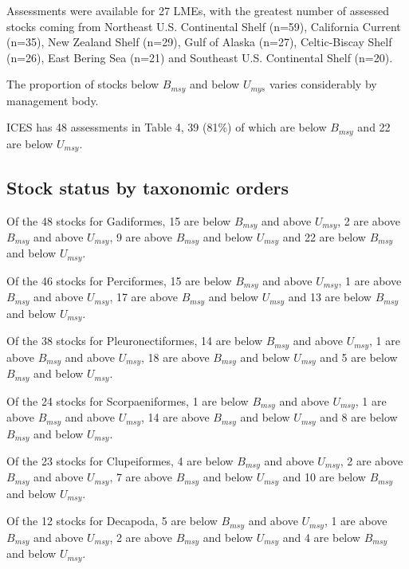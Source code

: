 

Assessments were available for 27 LMEs, with the greatest number of
assessed stocks coming from Northeast U.S. Continental Shelf (n=59),
California Current (n=35), New Zealand Shelf (n=29),
Gulf of Alaska (n=27), Celtic-Biscay Shelf (n=26), East Bering Sea (n=21)
and Southeast U.S. Continental Shelf (n=20).

The proportion of stocks below $B_{msy}$ and below $U_{mys}$ varies considerably by management body. 

ICES has 48 assessments in Table 4,
39
(81\%) of which are below
$B_{msy}$ and 22 are below
$U_{msy}$.

\subsection*{Stock status by taxonomic orders}

Of the 48 stocks for Gadiformes, 15 are below $B_{msy}$ and above $U_{msy}$, 2 are above $B_{msy}$ and above $U_{msy}$, 9 are above $B_{msy}$ and below $U_{msy}$ and 22 are below $B_{msy}$ and below $U_{msy}$.

Of the 46 stocks for Perciformes, 15 are below $B_{msy}$ and above $U_{msy}$, 1 are above $B_{msy}$ and above $U_{msy}$, 17 are above $B_{msy}$ and below $U_{msy}$ and 13 are below $B_{msy}$ and below $U_{msy}$.

Of the 38 stocks for Pleuronectiformes, 14 are below $B_{msy}$ and above $U_{msy}$, 1 are above $B_{msy}$ and above $U_{msy}$, 18 are above $B_{msy}$ and below $U_{msy}$ and 5 are below $B_{msy}$ and below $U_{msy}$.

Of the 24 stocks for Scorpaeniformes, 1 are below $B_{msy}$ and above $U_{msy}$, 1 are above $B_{msy}$ and above $U_{msy}$, 14 are above $B_{msy}$ and below $U_{msy}$ and 8 are below $B_{msy}$ and below $U_{msy}$.

Of the 23 stocks for Clupeiformes, 4 are below $B_{msy}$ and above $U_{msy}$, 2 are above $B_{msy}$ and above $U_{msy}$, 7 are above $B_{msy}$ and below $U_{msy}$ and 10 are below $B_{msy}$ and below $U_{msy}$.

Of the 12 stocks for Decapoda, 5 are below $B_{msy}$ and above $U_{msy}$, 1 are above $B_{msy}$ and above $U_{msy}$, 2 are above $B_{msy}$ and below $U_{msy}$ and 4 are below $B_{msy}$ and below $U_{msy}$.



